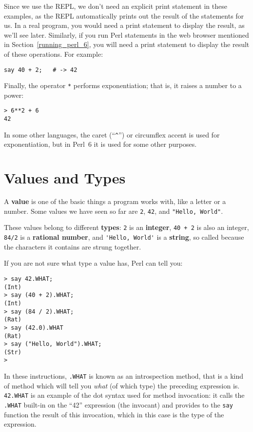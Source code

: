 Since we use the REPL, we don't need an explicit print 
statement in these examples, as the REPL automatically 
prints out the result of the statements for us. In a real 
program, you would need a print statement to display 
the result, as we'll see later. Similarly, if you run 
Perl statements in the web browser mentioned in 
Section~\ref{running_perl_6}, you will need a 
print statement to display the result of these operations. 
For example:

\begin{verbatim}
say 40 + 2;   # -> 42
\end{verbatim}


Finally, the operator {\tt **} performs exponentiation; that is,
it raises a number to a power:

\begin{verbatim}
> 6**2 + 6
42
\end{verbatim}
%
In some other languages, the caret (``\verb"^"'') or 
circumflex accent is used for exponentiation, but in 
Perl~6 it is used for some other purposes.
%


\section{Values and Types}
\label{values_and_types}

A {\bf value} is one of the basic things a program works with, like a
letter or a number.  Some values we have seen so far are {\tt 2},
{\tt 42}, and \verb'"Hello, World"'.

These values belong to different {\bf types}:
{\tt 2} is an {\bf integer}, {\tt 40 + 2} is also an integer, 
{\tt 84/2} is a {\bf rational number},
and \verb"'Hello, World'" is a {\bf string}, so called 
because the characters it contains are strung together.

If you are not sure what type a value has, Perl can
tell you:

\begin{verbatim}
> say 42.WHAT;
(Int)
> say (40 + 2).WHAT;
(Int)
> say (84 / 2).WHAT;
(Rat)
> say (42.0).WHAT
(Rat)
> say ("Hello, World").WHAT;
(Str)
>
\end{verbatim}
%
In these instructions, {\tt .WHAT} is known as an 
introspection method, that is a kind of method which 
will tell you \emph{what} (of  which type) the preceding 
expression is. {\tt 42.WHAT} is an example of the dot 
syntax used for method invocation: it calls the {\tt .WHAT} 
built-in on the ``42'' expression (the invocant) and provides 
to the {\tt say} function the result of this invocation, 
which in this case is the type of the expression.

